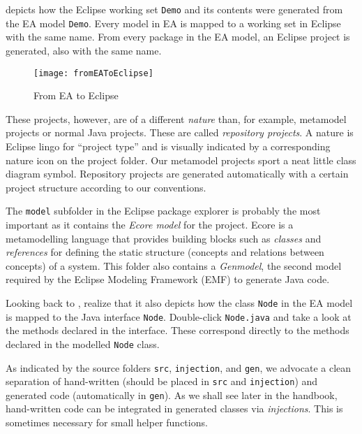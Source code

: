 depicts how the Eclipse working set \texttt{Demo} and its contents were generated from the EA model \texttt{Demo}. Every model
in EA is mapped to a working set in Eclipse with the same name. From every package in the EA model, an Eclipse project is generated, also with the same name.

\begin{figure}[htbp]
    \centering
  \texttt{[image: fromEAToEclipse]}
    \caption{From EA to Eclipse}
    \label{fig:fromEAtoEclipse}
\end{figure}

These projects, however, are of a different \emph{nature} than, for example, metamodel projects or normal Java projects. These are called \emph{repository
projects}. A nature is Eclipse lingo for ``project type'' and is visually indicated by a corresponding nature icon on the project folder. Our metamodel projects
sport a neat little class diagram symbol. Repository projects are generated automatically with a certain project structure according to our conventions.

The \texttt{model} subfolder in the Eclipse package explorer is probably the most important as it contains the \emph{Ecore model} for the project. Ecore is a
metamodelling language that provides building blocks such as \emph{classes} and \emph{references} for defining the  static structure (concepts and relations
between concepts) of a system. This folder also contains a \emph{Genmodel}, the second model required by the Eclipse Modeling Framework (EMF) to generate Java
code.

Looking back to , realize that it also depicts how the class \texttt{Node} in the EA model is mapped to the Java interface
\texttt{Node}. Double-click \texttt{Node.java} and take a look at the methods declared in the interface. These correspond directly to the methods declared in
the modelled \texttt{Node} class.

As indicated by the source folders \texttt{src}, \texttt{injection}, and \texttt{gen}, we advocate a clean separation of hand-written (should be placed in
\texttt{src} and \texttt{injection}) and generated code (automatically in \texttt{gen}). As we shall see later in the handbook, hand-written code can be
integrated in generated classes via \emph{injections}. This is sometimes necessary for small helper functions.

